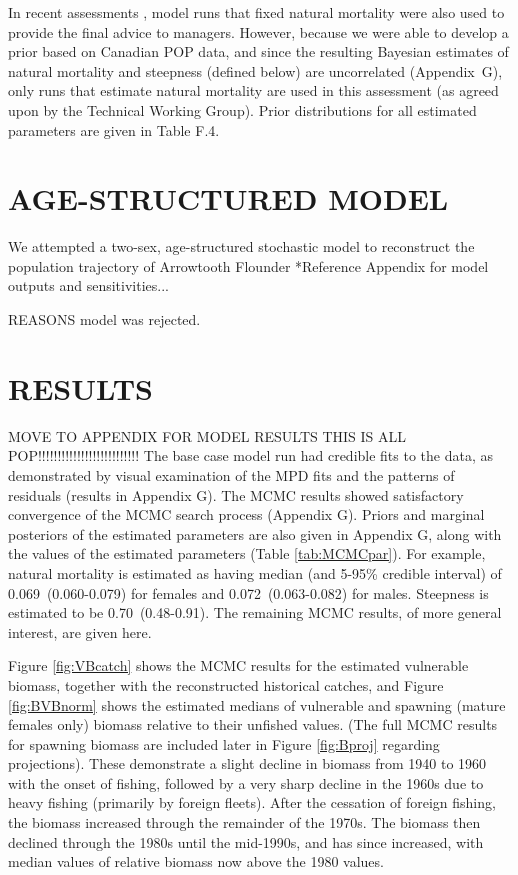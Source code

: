 In recent assessments , model runs that fixed natural mortality were also used to provide the final advice to managers. However, because we were able to develop a prior based on Canadian POP data, and since the resulting Bayesian estimates of natural mortality and steepness (defined below) are uncorrelated (Appendix~G), only runs that estimate natural mortality are used in this assessment (as agreed upon by the Technical Working Group). Prior distributions for all estimated parameters are given in Table F.4.

\section{AGE-STRUCTURED MODEL}

We attempted a two-sex, age-structured stochastic model to reconstruct the population trajectory of Arrowtooth Flounder
*Reference Appendix for model outputs and sensitivities...

REASONS model was rejected.

\section{RESULTS}

MOVE TO APPENDIX FOR MODEL RESULTS
THIS IS ALL POP!!!!!!!!!!!!!!!!!!!!!!!!!!
The base case model run had credible fits to the data, as demonstrated by visual examination of the MPD fits and the patterns of residuals (results in Appendix G). The MCMC results showed satisfactory convergence of the MCMC search process (Appendix G). Priors and marginal posteriors of the estimated parameters are also given in Appendix G, along with the values of the estimated parameters (Table \ref{tab:MCMCpar}). For example, natural mortality is estimated as having median (and 5-95\% credible interval) of 0.069~(0.060-0.079) for females and 0.072~(0.063-0.082) for males. Steepness is estimated to be 0.70~(0.48-0.91). The remaining MCMC results, of more general interest, are given here.

Figure \ref{fig:VBcatch} shows the MCMC results for the estimated vulnerable biomass, together with the reconstructed historical catches, and Figure \ref{fig:BVBnorm} shows the estimated medians of vulnerable and spawning (mature females only) biomass relative to their unfished values. (The full MCMC results for spawning biomass are included later in Figure \ref{fig:Bproj} regarding projections). These demonstrate a slight decline in biomass from 1940 to 1960 with the onset of fishing, followed by a very sharp decline in the 1960s due to heavy fishing (primarily by foreign fleets). After the cessation of foreign fishing, the biomass increased through the remainder of the 1970s. The biomass then declined through the 1980s until the mid-1990s, and has since increased, with median values of relative biomass now above the 1980 values.

